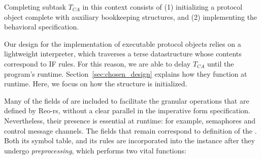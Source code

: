 Completing subtask $T_{CA}$ in this context consists of (1) initializing a protocol object complete with auxiliary bookkeeping structures, and (2) implementing the behavioral specification.

Our design for the implementation of executable protocol objects relies on a lightweight interpreter, which traverses a terse datastructure whose contents correspond to IF rules. For this reason, we are able to delay $T_{CA}$ until the program's runtime. Section~\ref{sec:chosen_design} explains how they function at runtime. Here, we focus on how the  structure is initialized.

Many of the fields of  are included to facilitate the granular operations that are defined by Reo-rs, without a clear parallel in the imperative form specification. Nevertheless, their presence is essential at runtime: for example, semaphores and control message channels. The fields that remain correspond to definition of the . Both its symbol table, and its rules are incorporated into the  instance after they undergo \textit{preprocessing}, which performs two vital functions:

